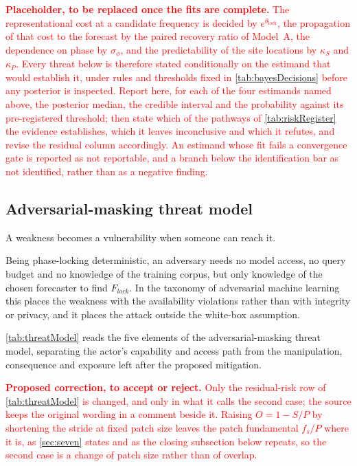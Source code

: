 \textcolor{red}{\textbf{Placeholder, to be replaced once the fits are complete.} The representational cost at a candidate frequency is decided by $e^{\theta_{\mathrm{lock}}}$, the propagation of that cost to the forecast by the paired recovery ratio of Model~A, the dependence on phase by $\sigma_\phi$, and the predictability of the site locations by $\kappa_S$ and $\kappa_P$. Every threat below is therefore stated conditionally on the estimand that would establish it, under rules and thresholds fixed in \autoref{tab:bayesDecisions} before any posterior is inspected. Report here, for each of the four estimands named above, the posterior median, the credible interval and the probability against its pre-registered threshold; then state which of the pathways of \autoref{tab:riskRegister} the evidence establishes, which it leaves inconclusive and which it refutes, and revise the residual column accordingly. An estimand whose fit fails a convergence gate is reported as not reportable, and a branch below the identification bar as not identified, rather than as a negative finding.}



\subsection{Adversarial-masking threat model}
A weakness becomes a vulnerability when someone can reach it.

Being phase-locking deterministic, an adversary needs no model access, no query budget and no knowledge of the training corpus, but only knowledge of the chosen forecaster to find $F_{lock}$. In the taxonomy of adversarial machine learning\autocite{vassilevAdversarialMachineLearning2024} this places the weakness with the availability violations rather than with integrity or privacy, and it places the attack outside the white-box assumption.

\autoref{tab:threatModel} reads the five elements of the adversarial-masking threat model\autocite{vassilevAdversarialMachineLearning2024}, separating the actor's capability and access path from the manipulation, consequence and exposure left after the proposed mitigation.



\textcolor{red}{\textbf{Proposed correction, to accept or reject.} Only the residual-risk row of \autoref{tab:threatModel} is changed, and only in what it calls the second case; the source keeps the original wording in a comment beside it. Raising $O=1-S/P$ by shortening the stride at fixed patch size leaves the patch fundamental $f_s/P$ where it is, as \autoref{sec:seven} states and as the closing subsection below repeats, so the second case is a change of patch size rather than of overlap.}

